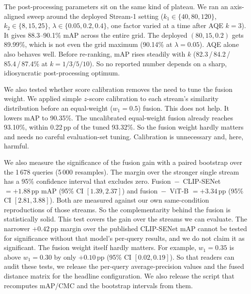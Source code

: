 The post-processing parameters sit on the same kind of plateau. We ran an axis-aligned sweep around the deployed Stream-1 setting ($k_1\in\{40,80,120\}$, $k_2\in\{8,15,25\}$, $\lambda\in\{0.05,0.2,0.4\}$, one factor varied at a time after AQE $k{=}3$). It gives 88.3--90.1\% mAP across the entire grid. The deployed $(80,15,0.2)$ gets 89.99\%, which is not even the grid maximum (90.14\% at $\lambda{=}0.05$). AQE alone also behaves well. Before re-ranking, mAP rises steadily with $k$ (82.3\,/\,84.2\,/\,85.4\,/\,87.4\% at $k{=}1/3/5/10$). So no reported number depends on a sharp, idiosyncratic post-processing optimum.

We also tested whether score calibration removes the need to tune the fusion weight. We applied simple $z$-score calibration to each stream's similarity distribution before an equal-weight ($w_1{=}0.5$) fusion. This does not help. It lowers mAP to 90.35\%. The uncalibrated equal-weight fusion already reaches 93.10\%, within 0.22\,pp of the tuned 93.32\%. So the fusion weight hardly matters and needs no careful evaluation-set tuning. Calibration is unnecessary and, here, harmful.

We also measure the significance of the fusion gain with a paired bootstrap over the 1\,678 queries (5\,000 resamples). The margin over the stronger single stream has a 95\% confidence interval that excludes zero. Fusion~$-$~CLIP-SENet $=+1.88$\,pp mAP (95\% CI $[1.39, 2.37]$) and fusion~$-$~ViT-B $=+3.34$\,pp (95\% CI $[2.81, 3.88]$). Both are measured against our own same-condition reproductions of those streams. So the complementarity behind the fusion is statistically solid. This test covers the gain over the streams we can evaluate. The narrower $+0.42$\,pp margin over the published CLIP-SENet mAP cannot be tested for significance without that model's per-query results, and we do not claim it as significant. The fusion weight itself hardly matters. For example, $w_1{=}0.35$ is above $w_1{=}0.30$ by only $+0.10$\,pp (95\% CI $[0.02, 0.19]$). So that readers can audit these tests, we release the per-query average-precision values and the fused distance matrix for the headline configuration. We also release the script that recomputes mAP/CMC and the bootstrap intervals from them.
